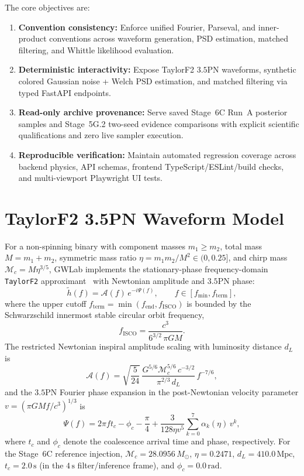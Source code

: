 \documentclass[11pt,a4paper]{article}
\begin{document}
The core objectives are:
\begin{enumerate}[leftmargin=1.5em]
    \item \textbf{Convention consistency:} Enforce unified Fourier, Parseval, and inner-product conventions across waveform generation, PSD estimation, matched filtering, and Whittle likelihood evaluation.
    \item \textbf{Deterministic interactivity:} Expose TaylorF2 $3.5\mathrm{PN}$ waveforms, synthetic colored Gaussian noise + Welch PSD estimation, and matched filtering via typed FastAPI endpoints.
    \item \textbf{Read-only archive provenance:} Serve saved Stage~6C Run~A posterior samples and Stage~5G.2 two-seed evidence comparisons with explicit scientific qualifications and zero live sampler execution.
    \item \textbf{Reproducible verification:} Maintain automated regression coverage across backend physics, API schemas, frontend TypeScript/ESLint/build checks, and multi-viewport Playwright UI tests.
\end{enumerate}

\section{TaylorF2 3.5PN Waveform Model}
For a non-spinning binary with component masses $m_1 \ge m_2$, total mass $M = m_1 + m_2$, symmetric mass ratio $\eta = m_1 m_2 / M^2 \in (0, 0.25]$, and chirp mass $\mathcal{M}_c = M \eta^{3/5}$, GWLab implements the stationary-phase frequency-domain \texttt{TaylorF2} approximant~\cite{SathyaprakashDhurandhar1991,Buonanno2009} with Newtonian amplitude and $3.5\mathrm{PN}$ phase:
\begin{equation}
\tilde{h}(f) = \mathcal{A}(f)\,e^{-i\Psi(f)}, \qquad f \in [f_{\min}, f_{\mathrm{term}}],
\end{equation}
where the upper cutoff $f_{\mathrm{term}} = \min(f_{\mathrm{end}}, f_{\mathrm{ISCO}})$ is bounded by the Schwarzschild innermost stable circular orbit frequency,
\begin{equation}
f_{\mathrm{ISCO}} = \frac{c^3}{6^{3/2}\,\pi G M}.
\end{equation}
The restricted Newtonian inspiral amplitude scaling with luminosity distance $d_L$ is
\begin{equation}
\mathcal{A}(f) = \sqrt{\frac{5}{24}}\,\frac{G^{5/6}\mathcal{M}_c^{5/6}\,c^{-3/2}}{\pi^{2/3}\,d_L}\,f^{-7/6},
\end{equation}
and the $3.5\mathrm{PN}$ Fourier phase expansion in the post-Newtonian velocity parameter $v = (\pi G M f / c^3)^{1/3}$ is
\begin{equation}
\Psi(f) = 2\pi f t_c - \phi_c - \frac{\pi}{4} + \frac{3}{128\eta v^5}\sum_{k=0}^{7} \alpha_k(\eta)\,v^k,
\end{equation}
where $t_c$ and $\phi_c$ denote the coalescence arrival time and phase, respectively. For the Stage~6C reference injection, $\mathcal{M}_c = 28.0956\,M_\odot$, $\eta = 0.2471$, $d_L = 410.0\,\mathrm{Mpc}$, $t_c = 2.0\,\mathrm{s}$ (in the $4\,\mathrm{s}$ filter/inference frame), and $\phi_c = 0.0\,\mathrm{rad}$.
\end{document}
